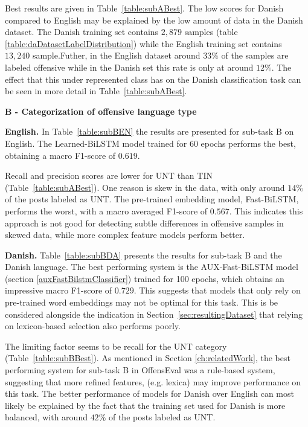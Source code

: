 \documentclass{article}
\begin{document}
Best results are given in Table~\ref{table:subABest}. 
The low scores for Danish compared to English may be explained by the low amount of data in the Danish dataset. The Danish training set contains $2,879$ samples (table \ref{table:daDatasetLabelDistribution}) while the English training set contains $13,240$ sample.Futher, in the English dataset around $33\%$ of the samples are labeled offensive while in the Danish set this rate is only at around $12\%$. The effect that this under represented class has on the Danish classification task can be seen in more detail in Table~\ref{table:subABest}. 



\textbf{B - Categorization of offensive language type}\label{sec:resultsSubB}

\textbf{English.} In Table~\ref{table:subBEN} the results are presented for sub-task B on English. The Learned-BiLSTM model  trained for 60 epochs performs the best, obtaining a macro F1-score of $0.619$. 

Recall and precision scores are lower for UNT than TIN  (Table~\ref{table:subABest}). One reason is skew in the data, with only around $14\%$ of the posts labeled as UNT. The pre-trained embedding model, Fast-BiLSTM, performs the worst, with a macro averaged F1-score of $0.567$. This indicates this approach is not  good for detecting subtle differences in offensive samples in skewed data, while more complex feature models perform better.

\textbf{Danish.} Table~\ref{table:subBDA} presents the results for sub-task B and the Danish language. The best performing system is the AUX-Fast-BiLSTM model (section \ref{auxFastBilstmClassifier}) trained for 100 epochs, which obtains an impressive macro F1-score of $0.729$. This suggests that models that only rely on pre-trained word embeddings may not be optimal for this task. This is be considered alongside the indication in Section~\ref{sec:resultingDataset} that relying on lexicon-based selection also performs poorly.

The limiting factor seems to be  recall for the UNT category (Table~\ref{table:subBBest}). As mentioned in Section \ref{ch:relatedWork}, the best performing system for sub-task B in OffensEval was a rule-based system, suggesting that more refined features, (e.g. lexica) may improve  performance on this task. The better performance of models for Danish over English can most likely be explained by the fact that the training set used for Danish is more balanced, with around $42\%$ of the posts labeled as UNT. \\
\end{document}
